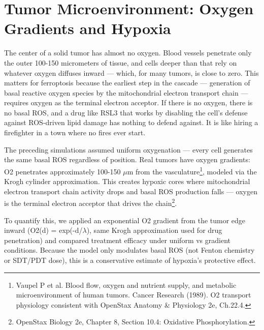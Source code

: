 \documentclass[11pt,twoside,openright]{report}
\begin{document}
\section{Tumor Microenvironment: Oxygen Gradients and Hypoxia}

The center of a solid tumor has almost no oxygen. Blood vessels penetrate only the outer 100-150 micrometers of tissue, and cells deeper than that rely on whatever oxygen diffuses inward --- which, for many tumors, is close to zero. This matters for ferroptosis because the earliest step in the cascade --- generation of basal reactive oxygen species by the mitochondrial electron transport chain --- requires oxygen as the terminal electron acceptor. If there is no oxygen, there is no basal ROS, and a drug like RSL3 that works by disabling the cell's defense against ROS-driven lipid damage has nothing to defend against. It is like hiring a firefighter in a town where no fires ever start.

The preceding simulations assumed uniform oxygenation --- every cell generates the same basal ROS regardless of position. Real tumors have oxygen gradients: O2 penetrates approximately 100-150 $\mu$m from the vasculature\footnote{Vaupel P et al. Blood flow, oxygen and nutrient supply, and metabolic microenvironment of human tumors. Cancer Research (1989). O2 transport physiology consistent with OpenStax Anatomy \& Physiology 2e, Ch.22.4.}, modeled via the Krogh cylinder approximation. This creates hypoxic cores where mitochondrial electron transport chain activity drops and basal ROS production falls --- oxygen is the terminal electron acceptor that drives the chain\footnote{OpenStax Biology 2e, Chapter 8, Section 10.4: Oxidative Phosphorylation.}.

To quantify this, we applied an exponential O2 gradient from the tumor edge inward (O2(d) = exp(-d/$\lambda$), same Krogh approximation used for drug penetration) and compared treatment efficacy under uniform vs gradient conditions. Because the model only modulates basal ROS (not Fenton chemistry or SDT/PDT dose), this is a conservative estimate of hypoxia's protective effect.
\end{document}
